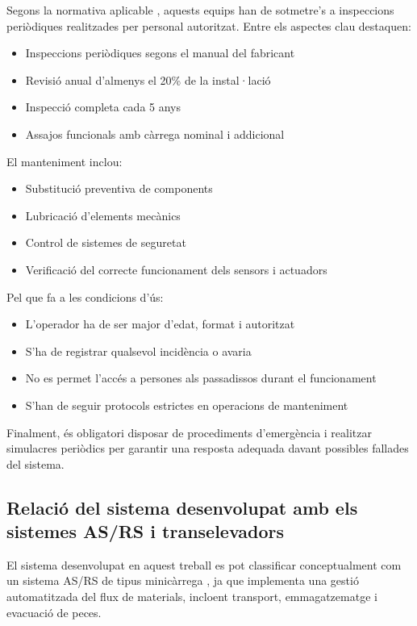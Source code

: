 \documentclass[a4paper,11pt,DIV=13,headings=normal,abstract=true,twoside=semi]{article}
\begin{document}
Segons la normativa aplicable \cite{manual_logistica}, aquests equips han de sotmetre's a inspeccions periòdiques realitzades per personal autoritzat. Entre els aspectes clau destaquen:

\begin{itemize}
    \item Inspeccions periòdiques segons el manual del fabricant
    \item Revisió anual d'almenys el 20\% de la instal·lació
    \item Inspecció completa cada 5 anys
    \item Assajos funcionals amb càrrega nominal i addicional
\end{itemize}

El manteniment inclou:

\begin{itemize}
    \item Substitució preventiva de components
    \item Lubricació d'elements mecànics
    \item Control de sistemes de seguretat
    \item Verificació del correcte funcionament dels sensors i actuadors
\end{itemize}

Pel que fa a les condicions d'ús:

\begin{itemize}
    \item L'operador ha de ser major d'edat, format i autoritzat
    \item S'ha de registrar qualsevol incidència o avaria
    \item No es permet l'accés a persones als passadissos durant el funcionament
    \item S'han de seguir protocols estrictes en operacions de manteniment
\end{itemize}

Finalment, és obligatori disposar de procediments d'emergència i realitzar simulacres periòdics per garantir una resposta adequada davant possibles fallades del sistema.

\subsection{Relació del sistema desenvolupat amb els sistemes AS/RS i transelevadors}

El sistema desenvolupat en aquest treball es pot classificar conceptualment com un sistema AS/RS de tipus minicàrrega \cite{asrs_daifuku}, ja que implementa una gestió automatitzada del flux de materials, incloent transport, emmagatzematge i evacuació de peces.
\end{document}
